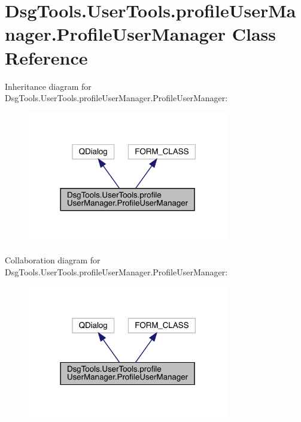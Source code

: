 \hypertarget{class_dsg_tools_1_1_user_tools_1_1profile_user_manager_1_1_profile_user_manager}{}\section{Dsg\+Tools.\+User\+Tools.\+profile\+User\+Manager.\+Profile\+User\+Manager Class Reference}
\label{class_dsg_tools_1_1_user_tools_1_1profile_user_manager_1_1_profile_user_manager}


Inheritance diagram for Dsg\+Tools.\+User\+Tools.\+profile\+User\+Manager.\+Profile\+User\+Manager\+:
\nopagebreak
\begin{figure}[H]
\begin{center}
\leavevmode
\includegraphics[width=249pt]{class_dsg_tools_1_1_user_tools_1_1profile_user_manager_1_1_profile_user_manager__inherit__graph}
\end{center}
\end{figure}


Collaboration diagram for Dsg\+Tools.\+User\+Tools.\+profile\+User\+Manager.\+Profile\+User\+Manager\+:
\nopagebreak
\begin{figure}[H]
\begin{center}
\leavevmode
\includegraphics[width=249pt]{class_dsg_tools_1_1_user_tools_1_1profile_user_manager_1_1_profile_user_manager__coll__graph}
\end{center}
\end{figure}
